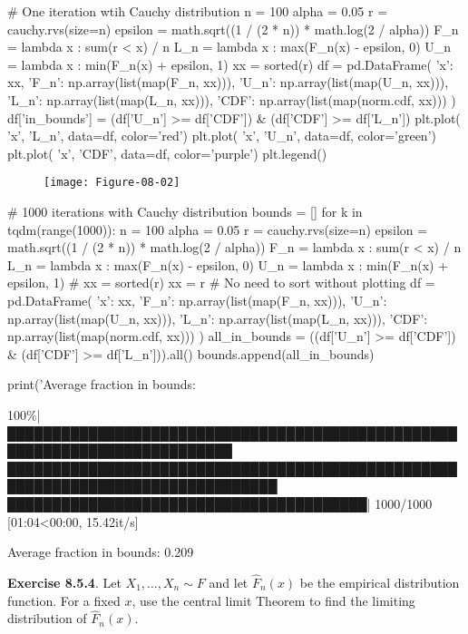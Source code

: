 \begin{python}
# One iteration wtih Cauchy distribution
n = 100
alpha = 0.05
r = cauchy.rvs(size=n)
epsilon = math.sqrt((1 / (2 * n)) * math.log(2 / alpha))
F_n = lambda x : sum(r < x) / n
L_n = lambda x : max(F_n(x) - epsilon, 0)
U_n = lambda x : min(F_n(x) + epsilon, 1)
xx = sorted(r)
df = pd.DataFrame({
    'x': xx, 
    'F_n': np.array(list(map(F_n, xx))), 
    'U_n': np.array(list(map(U_n, xx))), 
    'L_n': np.array(list(map(L_n, xx))), 
    'CDF': np.array(list(map(norm.cdf, xx)))
})
df['in_bounds'] = (df['U_n'] >= df['CDF']) & (df['CDF'] >= df['L_n'])
plt.plot( 'x', 'L_n', data=df, color='red')
plt.plot( 'x', 'U_n', data=df, color='green')
plt.plot( 'x', 'CDF', data=df, color='purple')
plt.legend()
\end{python}

\begin{figure}[H]
\centering
\texttt{[image: Figure-08-02]}
\end{figure}


\begin{python}
# 1000 iterations with Cauchy distribution
bounds = []
for k in tqdm(range(1000)):
    n = 100
    alpha = 0.05
    r = cauchy.rvs(size=n)
    epsilon = math.sqrt((1 / (2 * n)) * math.log(2 / alpha))
    F_n = lambda x : sum(r < x) / n
    L_n = lambda x : max(F_n(x) - epsilon, 0)
    U_n = lambda x : min(F_n(x) + epsilon, 1)
    # xx = sorted(r)
    xx = r # No need to sort without plotting
    df = pd.DataFrame({
        'x': xx, 
        'F_n': np.array(list(map(F_n, xx))), 
        'U_n': np.array(list(map(U_n, xx))), 
        'L_n': np.array(list(map(L_n, xx))), 
        'CDF': np.array(list(map(norm.cdf, xx)))
    })
    all_in_bounds = ((df['U_n'] >= df['CDF']) & (df['CDF'] >= df['L_n'])).all()
    bounds.append(all_in_bounds)
    
print('Average fraction in bounds: %
\end{python}
\begin{console}
100\%|███████████████████████████████████████████████████████████████████████████
████████████████████████████████████████████████████████████████████████████████
████████████████████████████████████████| 1000/1000 [01:04<00:00, 15.42it/s]
\end{console}
\begin{console}
Average fraction in bounds: 0.209
\end{console}

\textbf{Exercise 8.5.4}. Let \(X_{1}, \dots, X_{n} \sim F\) and let
\(\hat{F}_{n}(x)\) be the empirical distribution function. For a fixed
\(x\), use the central limit Theorem to find the limiting distribution
of \(\hat{F}_{n}(x)\).


